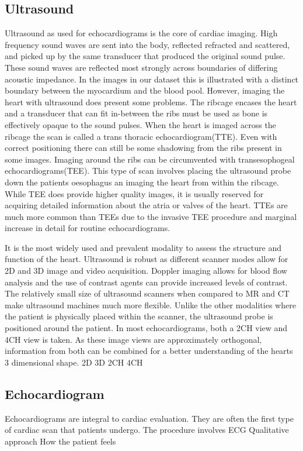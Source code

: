 \documentclass[12pt]{article}
\begin{document}
\subsection{Ultrasound}
Ultrasound as used for echocardiograms is the core of cardiac imaging. 
High frequency sound waves are sent into the body, reflected refracted and scattered, and picked up by the same transducer that produced the original sound pulse. 
These sound waves are reflected most strongly across boundaries of differing acoustic impedance.
In the images in our dataset this is illustrated with a distinct boundary between the myocardium and the blood pool.
However, imaging the heart with ultrasound does present some problems.
The ribcage encases the heart and a transducer that can fit in-between the ribs must be used as bone is effectively opaque to the sound pulses. 
When the heart is imaged across the ribcage the scan is called a trans thoracic echocardiogram(TTE).
Even with correct positioning there can still be some shadowing from the ribs present in some images.
Imaging around the ribs can be circumvented with transesophogeal echocardiograms(TEE). 
This type of scan involves placing the ultrasound probe down the patients oesophagus an imaging the heart from within the ribcage.
While TEE does provide higher quality images, it is usually reserved for acquiring detailed information about the atria or valves of the heart.
TTEs are much more common than TEEs due to the invasive TEE procedure and marginal increase in detail for routine echocardiograms.

It is the most widely used and prevalent modality to assess the structure and function of the heart.
Ultrasound is robust as different scanner modes allow for 2D and 3D image and video acquisition.
Doppler imaging allows for blood flow analysis and the use of contrast agents can provide increased levels of contrast.
The relatively small size of ultrasound scanners when compared to MR and CT make ultrasound machines much more flexible.
Unlike the other modalities where the patient is physically placed within the scanner, the ultrasound probe is positioned around the patient.
In most echocardiograms, both a 2CH view and 4CH view is taken. 
As these image views are approximately orthogonal, information from both can be combined for a better understanding of the hearts 3 dimensional shape.
2D
3D
2CH
4CH
\subsection{Echocardiogram}
Echocardiograms are integral to cardiac evaluation.
They are often the first type of cardiac scan that patients undergo.
The procedure involves
ECG
Qualitative approach
How the patient feels
\end{document}

